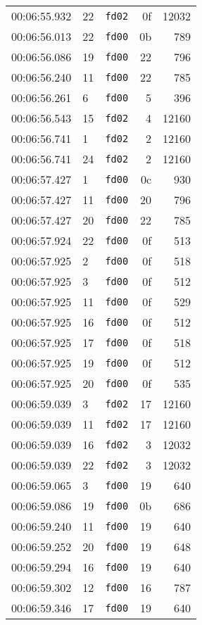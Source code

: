 \documentclass{article}
\begin{document}
\begin{longtable}{lllrr}
00:06:55.932 & 22 & \texttt{fd02} & 0f & 12032 \\
00:06:56.013 & 22 & \texttt{fd00} & 0b & 789 \\
00:06:56.086 & 19 & \texttt{fd00} & 22 & 796 \\
00:06:56.240 & 11 & \texttt{fd00} & 22 & 785 \\
00:06:56.261 & 6 & \texttt{fd00} & 5 & 396 \\
00:06:56.543 & 15 & \texttt{fd02} & 4 & 12160 \\
00:06:56.741 & 1 & \texttt{fd02} & 2 & 12160 \\
00:06:56.741 & 24 & \texttt{fd02} & 2 & 12160 \\
00:06:57.427 & 1 & \texttt{fd00} & 0c & 930 \\
00:06:57.427 & 11 & \texttt{fd00} & 20 & 796 \\
00:06:57.427 & 20 & \texttt{fd00} & 22 & 785 \\
00:06:57.924 & 22 & \texttt{fd00} & 0f & 513 \\
00:06:57.925 & 2 & \texttt{fd00} & 0f & 518 \\
00:06:57.925 & 3 & \texttt{fd00} & 0f & 512 \\
00:06:57.925 & 11 & \texttt{fd00} & 0f & 529 \\
00:06:57.925 & 16 & \texttt{fd00} & 0f & 512 \\
00:06:57.925 & 17 & \texttt{fd00} & 0f & 518 \\
00:06:57.925 & 19 & \texttt{fd00} & 0f & 512 \\
00:06:57.925 & 20 & \texttt{fd00} & 0f & 535 \\
00:06:59.039 & 3 & \texttt{fd02} & 17 & 12160 \\
00:06:59.039 & 11 & \texttt{fd02} & 17 & 12160 \\
00:06:59.039 & 16 & \texttt{fd02} & 3 & 12032 \\
00:06:59.039 & 22 & \texttt{fd02} & 3 & 12032 \\
00:06:59.065 & 3 & \texttt{fd00} & 19 & 640 \\
00:06:59.086 & 19 & \texttt{fd00} & 0b & 686 \\
00:06:59.240 & 11 & \texttt{fd00} & 19 & 640 \\
00:06:59.252 & 20 & \texttt{fd00} & 19 & 648 \\
00:06:59.294 & 16 & \texttt{fd00} & 19 & 640 \\
00:06:59.302 & 12 & \texttt{fd00} & 16 & 787 \\
00:06:59.346 & 17 & \texttt{fd00} & 19 & 640 \\

\end{longtable}
\end{document}
